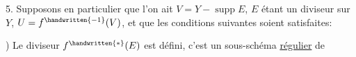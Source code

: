 5. Supposons en particulier que l'on ait $V=Y-\operatorname{supp}E$, $E$ étant un diviseur  sur $Y$,  $U=f^{\handwritten{-1}}(V)$, et que  les conditions suivantes soient satisfaites:


) Le diviseur  $f^{\handwritten{*}}(E)$ est défini, c'est un sous-schéma \uline{régulier} de
